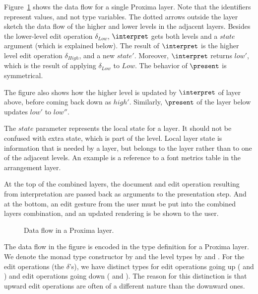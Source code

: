 \documentclass[preprint,natbib]{sigplanconf}
\begin{document}
Figure~\ref{proximaDataFlow} shows the data flow for a single Proxima layer. Note that the identifiers represent values, and not type variables. The dotted arrows outside the layer sketch the data flow of the higher and lower levels in the adjacent layers. Besides the lower-level edit operation $\delta_{Low}$, $\interpret$ gets both levels and a $state$ argument (which is explained below). The result of $\interpret$ is the higher level edit operation $\delta_{High}$, and a new $state'$. Moreover, $\interpret$ returns $low'$, which is the result of applying $\delta_{Low}$ to $Low$. The behavior of $\present$ is symmetrical.

The figure also shows how the higher level is updated by $\interpret$ of layer above, before coming back down as $high'$. Similarly, $\present$ of the layer below updates $low'$ to $low''$. 

The $state$ parameter represents the local state for a layer. It should not be confused with extra state, which is part of the level. Local layer state is information that is needed by a layer, but belongs to the layer rather than to one of the adjacent levels. An example is a reference to a font metrics table in the arrangement layer.

At the top of the combined layers, the document and edit operation resulting from interpretation are passed back as arguments to the presentation step. And at the bottom, an edit gesture from the user must be put into the combined layers combination, and an updated rendering is be shown to the user. 
 
\begin{figure}
\begin{small}
\begin{center}
\begin{center}
\end{center}\caption{Data flow in a Proxima layer.} \label{proximaDataFlow}
\end{center}
\end{small}
\end{figure}


The data flow in the figure is encoded in the type definition for a Proxima layer. We denote the monad type constructor by  and the level types by  and . For the edit operations (the $\delta$'s), we have distinct types for edit operations going up  ( and ) and edit operations going down ( and ). The reason for this distinction is that upward edit operations are often of a different nature than the downward ones.
\end{document}
